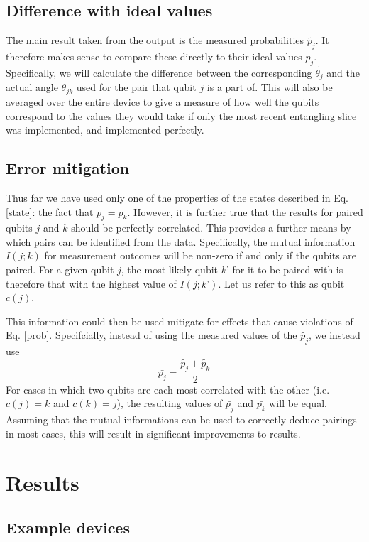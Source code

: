 \documentclass[aps,prl,twocolumn,showpacs,preprintnumbers]{revtex4-1}
\newcommand{\be}{\begin{equation}}
\newcommand{\ee}{\end{equation}}
\begin{document}
\subsection{Difference with ideal values}

The main result taken from the output is the measured probabilities $\tilde{p_j}$. It therefore makes sense to compare these directly to their ideal values $p_j$. Specifically, we will calculate the difference between the corresponding $\tilde{\theta_j}$ and the actual angle $\theta_{jk}$ used for the pair that qubit $j$ is a part of. This will also be averaged over the entire device to give a measure of how well the qubits correspond to the values they would take if only the most recent entangling slice was implemented, and implemented perfectly.

\subsection{Error mitigation}

Thus far we have used only one of the properties of the states described in Eq. \ref{state}: the fact that $p_j=p_k$. However, it is further true that the results for paired qubits $j$ and $k$ should be perfectly correlated. This provides a further means by which pairs can be identified from the data. Specifically, the mutual information $I(j;k)$ for measurement outcomes will be non-zero if and only if the qubits are paired. For a given qubit $j$, the most likely qubit $k’$ for it to be paired with is therefore that with the highest value of $I(j;k’)$. Let us refer to this as qubit $c(j)$.

This information could then be used mitigate for effects that cause violations of Eq. \ref{prob}. Specifcially, instead of using the measured values of the $\tilde{p_j}$, we instead use
\be
\bar{p_j} = \frac{ \tilde{p_j} + \tilde{p_k} }{2}
\ee
For cases in which two qubits are each most correlated with the other (i.e. $c(j)=k$ and $c(k)=j$), the resulting values of $\bar{p_j}$ and $\bar{p_k}$ will be equal. Assuming that the mutual informations can be used to correctly deduce pairings in most cases, this will result in significant improvements to results.


\section{Results}

\subsection{Example devices}
\end{document}
